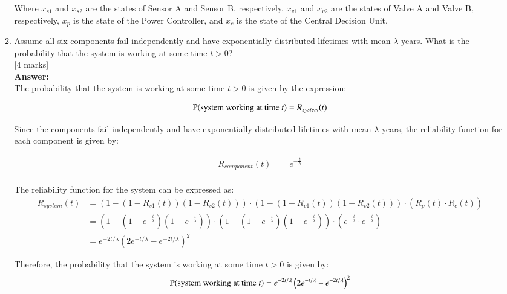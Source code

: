 \documentclass[12pt]{article}
\begin{document}
\begin{enumerate}
\begin{enumerate}
Where $x_{s1}$ and $x_{s2}$ are the states of Sensor A and Sensor B, respectively, $x_{v1}$ and $x_{v2}$ are the states of Valve A and Valve B, respectively, $x_{p}$ is the state of the Power Controller, and $x_{c}$ is the state of the Central Decision Unit.

\item Assume all six components fail independently and have exponentially distributed lifetimes with mean $\lambda$ years. What is the probability that the system is working at some time $t>0$? 
			\\\phantom{1}\hfill [4 marks] 
%
\\
\textbf{Answer:}
\\
The probability that the system is working at some time $t > 0$ is given by the expression:

\begin{align*}
{\mathbb P}(\text{system working at time } t) &= R_{system}(t) \\
\end{align*}

Since the components fail independently and have exponentially distributed lifetimes with mean $\lambda$ years, the reliability function for each component is given by:

\begin{align*}
R_{component}(t) &= e^{-\frac{t}{\lambda}} \\
\end{align*}

The reliability function for the system can be expressed as:
\begin{align*}
R_{system}(t) &= (1 - (1 - R_{s1}(t))(1 - R_{s2}(t))) \cdot (1 - (1 - R_{v1}(t))(1 - R_{v2}(t))) \cdot (R_{p}(t) \cdot R_{c}(t)) \\
&= (1 - (1 - e^{-\frac{t}{\lambda}})(1 - e^{-\frac{t}{\lambda}})) \cdot (1 - (1 - e^{-\frac{t}{\lambda}})(1 - e^{-\frac{t}{\lambda}})) \cdot (e^{-\frac{t}{\lambda}} \cdot e^{-\frac{t}{\lambda}}) \\
&=  e^{-2t/\lambda} \left(2e^{-t/\lambda} - e^{-2t/\lambda}\right)^2
\end{align*}

Therefore, the probability that the system is working at some time $t > 0$ is given by:
\begin{align*}
{\mathbb P}(\text{system working at time } t) &= e^{-2t/\lambda} \left(2e^{-t/\lambda} - e^{-2t/\lambda}\right)^2 \\
\end{align*}

\end{enumerate}

\end{enumerate}
\end{document}
